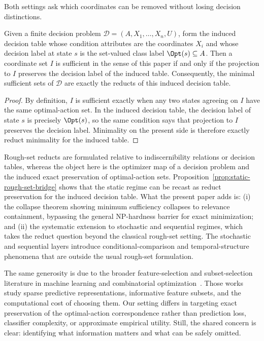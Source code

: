 Both settings ask which coordinates can be removed without losing decision distinctions.

\begin{proposition}\label{prop:static-rough-set-bridge}
Given a finite decision problem $\mathcal{D}=(A,X_1,\ldots,X_n,U)$, form the induced decision table whose condition attributes are the coordinates $X_i$ and whose decision label at state $s$ is the set-valued class label $\Opt(s) \subseteq A$. Then a coordinate set $I$ is sufficient in the sense of this paper if and only if the projection to $I$ preserves the decision label of the induced table. Consequently, the minimal sufficient sets of $\mathcal{D}$ are exactly the reducts of this induced decision table.
\end{proposition}

\begin{proof}
By definition, $I$ is sufficient exactly when any two states agreeing on $I$ have the same optimal-action set. In the induced decision table, the decision label of state $s$ is precisely $\Opt(s)$, so the same condition says that projection to $I$ preserves the decision label. Minimality on the present side is therefore exactly reduct minimality for the induced table.
\end{proof}

Rough-set reducts are formulated relative to indiscernibility relations or decision tables, whereas the object here is the optimizer map of a decision problem and the induced exact preservation of optimal-action sets. Proposition~\ref{prop:static-rough-set-bridge} shows that the static regime can be recast as reduct preservation for the induced decision table. What the present paper adds is: (i) the collapse theorem showing minimum sufficiency collapses to relevance containment, bypassing the general NP-hardness barrier for exact minimization; and (ii) the systematic extension to stochastic and sequential regimes, which takes the reduct question beyond the classical rough-set setting. The stochastic and sequential layers introduce conditional-comparison and temporal-structure phenomena that are outside the usual rough-set formulation.

The same generosity is due to the broader feature-selection and subset-selection literature in machine learning and combinatorial optimization~\cite{blum1997selection,amaldi1998complexity}. Those works study sparse predictive representations, informative feature subsets, and the computational cost of choosing them. Our setting differs in targeting exact preservation of the optimal-action correspondence rather than prediction loss, classifier complexity, or approximate empirical utility. Still, the shared concern is clear: identifying what information matters and what can be safely omitted.

